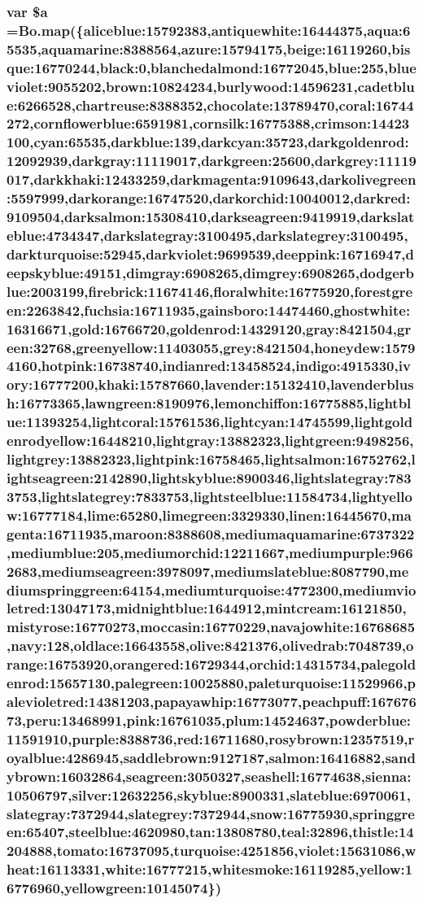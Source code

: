 \subsubsection[{\$a}]{\setlength{\rightskip}{0pt plus 5cm}var \${\bf a} ={\bf Bo.\+map}(\{aliceblue\+:15792383,antiquewhite\+:16444375,aqua\+:65535,aquamarine\+:8388564,azure\+:15794175,beige\+:16119260,bisque\+:16770244,black\+:0,blanchedalmond\+:16772045,blue\+:255,blueviolet\+:9055202,brown\+:10824234,burlywood\+:14596231,cadetblue\+:6266528,chartreuse\+:8388352,chocolate\+:13789470,coral\+:16744272,cornflowerblue\+:6591981,cornsilk\+:16775388,crimson\+:14423100,cyan\+:65535,darkblue\+:139,darkcyan\+:35723,darkgoldenrod\+:12092939,darkgray\+:11119017,darkgreen\+:25600,darkgrey\+:11119017,darkkhaki\+:12433259,darkmagenta\+:9109643,darkolivegreen\+:5597999,darkorange\+:16747520,darkorchid\+:10040012,darkred\+:9109504,darksalmon\+:15308410,darkseagreen\+:9419919,darkslateblue\+:4734347,darkslategray\+:3100495,darkslategrey\+:3100495,darkturquoise\+:52945,darkviolet\+:9699539,deeppink\+:16716947,deepskyblue\+:49151,dimgray\+:6908265,dimgrey\+:6908265,dodgerblue\+:2003199,firebrick\+:11674146,floralwhite\+:16775920,forestgreen\+:2263842,fuchsia\+:16711935,gainsboro\+:14474460,ghostwhite\+:16316671,gold\+:16766720,goldenrod\+:14329120,gray\+:8421504,green\+:32768,greenyellow\+:11403055,grey\+:8421504,honeydew\+:15794160,hotpink\+:16738740,indianred\+:13458524,indigo\+:4915330,ivory\+:16777200,khaki\+:15787660,lavender\+:15132410,lavenderblush\+:16773365,lawngreen\+:8190976,lemonchiffon\+:16775885,lightblue\+:11393254,lightcoral\+:15761536,lightcyan\+:14745599,lightgoldenrodyellow\+:16448210,lightgray\+:13882323,lightgreen\+:9498256,lightgrey\+:13882323,lightpink\+:16758465,lightsalmon\+:16752762,lightseagreen\+:2142890,lightskyblue\+:8900346,lightslategray\+:7833753,lightslategrey\+:7833753,lightsteelblue\+:11584734,lightyellow\+:16777184,lime\+:65280,limegreen\+:3329330,linen\+:16445670,magenta\+:16711935,maroon\+:8388608,mediumaquamarine\+:6737322,mediumblue\+:205,mediumorchid\+:12211667,mediumpurple\+:9662683,mediumseagreen\+:3978097,mediumslateblue\+:8087790,mediumspringgreen\+:64154,mediumturquoise\+:4772300,mediumvioletred\+:13047173,midnightblue\+:1644912,mintcream\+:16121850,mistyrose\+:16770273,moccasin\+:16770229,navajowhite\+:16768685,navy\+:128,oldlace\+:16643558,olive\+:8421376,olivedrab\+:7048739,orange\+:16753920,orangered\+:16729344,orchid\+:14315734,palegoldenrod\+:15657130,palegreen\+:10025880,paleturquoise\+:11529966,palevioletred\+:14381203,papayawhip\+:16773077,peachpuff\+:16767673,peru\+:13468991,pink\+:16761035,plum\+:14524637,powderblue\+:11591910,purple\+:8388736,red\+:16711680,rosybrown\+:12357519,royalblue\+:4286945,saddlebrown\+:9127187,salmon\+:16416882,sandybrown\+:16032864,seagreen\+:3050327,seashell\+:16774638,sienna\+:10506797,silver\+:12632256,skyblue\+:8900331,slateblue\+:6970061,slategray\+:7372944,slategrey\+:7372944,snow\+:16775930,springgreen\+:65407,steelblue\+:4620980,tan\+:13808780,teal\+:32896,thistle\+:14204888,tomato\+:16737095,turquoise\+:4251856,violet\+:15631086,wheat\+:16113331,white\+:16777215,whitesmoke\+:16119285,yellow\+:16776960,yellowgreen\+:10145074\})}\label{d3_8min_8js_a53fccbec88b87339d35b44ab265a07a2}


